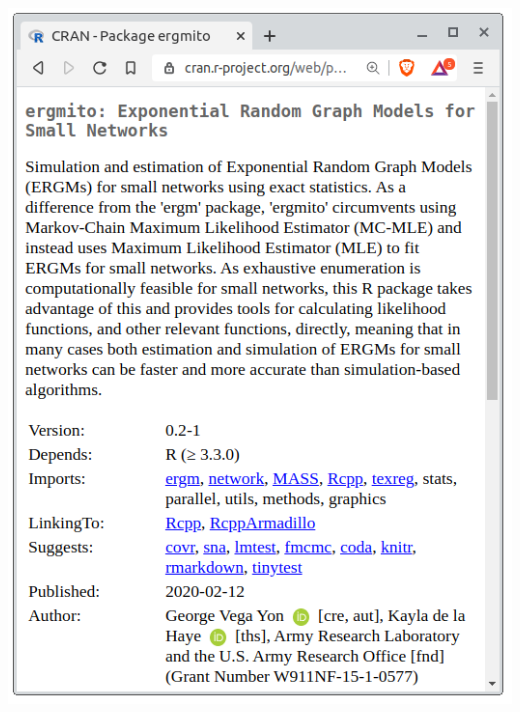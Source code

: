 \documentclass[aspectratio=169, 9pt]{beamer}
\begin{document}
\begin{frame}[c,label=ergmito-checklist]
\begin{minipage}[m]{.28\linewidth}
\end{minipage}
\hfill
\begin{minipage}[m]{.34\linewidth}
	\centering
	\includegraphics[width=.99\linewidth]{ergmito-page-cran.png}
\end{minipage}
\hfill
\begin{minipage}[m]{.34\linewidth}
	\centering

\end{minipage}
\end{frame}
\end{document}
